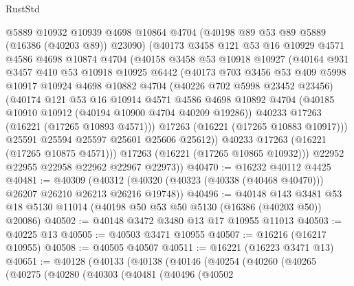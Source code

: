 \begin{lexlean}{RustStd}
\begin{coremodule}
          @5889
          @10932
          @10939
          @4698
          @10864
          @4704
          (@40198 @89 @53 @89 @5889 (@16386 (@40203 @89)) @23090)
          (@40173
            @3458
            @121
            @53
            @16
            @10929
            @4571
            @4586
            @4698
            @10874
            @4704
            (@40158
              @3458
              @53
              @10918
              @10927
              (@40164
                @931
                @3457
                @410
                @53
                @10918
                @10925
                @6442
                (@40173
                  @703
                  @3456
                  @53
                  @409
                  @5998
                  @10917
                  @10924
                  @4698
                  @10882
                  @4704
                  (@40226 @702 @5998 @23452 @23456)
                  (@40174
                    @121
                    @53
                    @16
                    @10914
                    @4571
                    @4586
                    @4698
                    @10892
                    @4704
                    (@40185 @10910 @10912 (@40194 @10900 @4704 @40209 @19286))
                    @40233
                    @17263
                    (@16221 (@17265 @10893 @4571)))
                  @17263
                  (@16221 (@17265 @10883 @10917)))
                @25591
                @25594
                @25597
                @25601
                @25606
                @25612))
            @40233
            @17263
            (@16221 (@17265 @10875 @4571)))
          @17263
          (@16221 (@17265 @10865 @10932)))
        @22952
        @22955
        @22958
        @22962
        @22967
        @22973))
@40470 := @16232 @40112 @4425
@40481 := @40309
    (@40312 (@40320 (@40323 (@40338 (@40468 @40470))) @26207 @26210 @26213 @26216 @19748))
@40496 := @40148
    @143
    @3481
    @53
    @18
    @5130
    @11014
    (@40198 @50 @53 @50 @5130 (@16386 (@40203 @50)) @20086)
@40502 := @40148 @3472 @3480 @13 @17 @10955 @11013
@40503 := @40225 @13
@40505 := @40503 @3471 @10955
@40507 := @16216 (@16217 @10955)
@40508 := @40505 @40507
@40511 := @16221 (@16223 @3471 @13)
@40651 := @40128
    (@40133
      (@40138
        (@40146
          (@40254
            (@40260
              (@40265
                (@40275
                  (@40280
                    (@40303
                      (@40481
                        (@40496
                          (@40502

\end{coremodule}
\end{lexlean}
